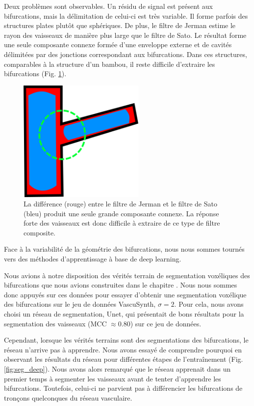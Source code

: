 Deux problèmes sont observables. Un résidu de signal est présent aux bifurcations, mais la délimitation de celui-ci est très variable. Il forme parfois des structures plates plutôt que sphériques. De plus, le filtre de Jerman estime le rayon des vaisseaux de manière plus large que le filtre de Sato. Le résultat forme une seule composante connexe formée d'une enveloppe externe et de cavités délimitées par des jonctions correspondant aux bifurcations. Dans ces structures, comparables à la structure d'un bambou, il reste difficile d'extraire les bifurcations (Fig. \ref{fig:combo_vesselness}).
\begin{figure}[!ht]
    \centering
    \includegraphics[height=6cm]{Images/combo_vesselness_2D.png}
    \caption{La différence (rouge) entre le filtre de Jerman et le filtre de Sato (bleu) produit une seule grande composante connexe. La réponse forte des vaisseaux est donc difficile à extraire de ce type de filtre composite.}
    \label{fig:combo_vesselness}
\end{figure}


Face à la variabilité de la géométrie des bifurcations, nous nous sommes tournés vers des méthodes d'apprentissage à base de deep learning.

Nous avions à notre disposition des vérités terrain de segmentation voxéliques des bifurcations que nous avions construites dans le chapitre \chapBenchN{}. Nous nous sommes donc appuyés sur ces données pour essayer d'obtenir une segmentation voxélique des bifurcations sur le jeu de données VascuSynth, $\sigma=2$. Pour cela, nous avons choisi un réseau de segmentation, Unet, qui présentait de bons résultats pour la segmentation des vaisseaux (MCC $\approx 0.80$) sur ce jeu de données.

Cependant, lorsque les vérités terrains sont des segmentations des bifurcations, le réseau n'arrive pas à apprendre. Nous avons essayé de comprendre pourquoi en observant les résultats du réseau pour différentes étapes de l'entraînement (Fig. \ref{fig:seg_deep}). Nous avons alors remarqué que le réseau apprenait dans un premier temps à segmenter les vaisseaux avant de tenter d'apprendre les bifurcations. Toutefois, celui-ci ne parvient pas à différencier les bifurcations de tronçons quelconques du réseau vasculaire.

